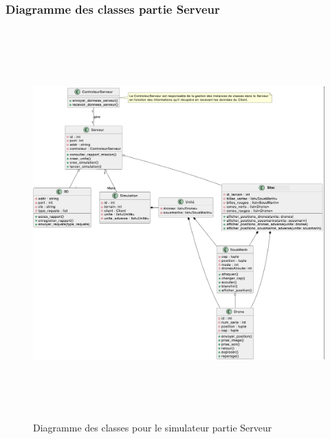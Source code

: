 \subsubsection{Diagramme des classes partie Serveur}
\begin{figure}[H]
	\centering
	\includegraphics[height=15cm]{img/serveur.png} 
	\caption{Diagramme des classes pour le simulateur partie Serveur}
\end{figure}

